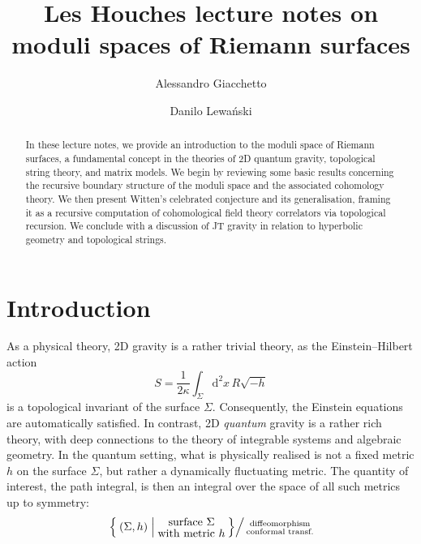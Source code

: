 \documentclass[11pt,reqno]{amsart}
\title[Moduli spaces of Riemann surfaces]{Les Houches lecture notes on moduli spaces of Riemann surfaces}
\author[A.~Giacchetto]{Alessandro Giacchetto}
\author[D.~Lewa{\'{n}}ski]{Danilo Lewa{\'{n}}ski}
\numberwithin{equation}{section}
\newcommand{\dd}{\mathrm{d}}
\theoremstyle{plain}
\theoremstyle{definition}
\begin{document}
\begin{abstract}
  In these lecture notes, we provide an introduction to the moduli space of Riemann surfaces, a fundamental concept in the theories of 2D quantum gravity, topological string theory, and matrix models. We begin by reviewing some basic results concerning the recursive boundary structure of the moduli space and the associated cohomology theory. We then present Witten's celebrated conjecture and its generalisation, framing it as a recursive computation of cohomological field theory correlators via topological recursion. We conclude with a discussion of JT gravity in relation to hyperbolic geometry and topological strings.
\end{abstract}

\maketitle

\vspace{-.5cm}

\setcounter{tocdepth}{2}
\tableofcontents

\newpage
\section{Introduction}
\label{sec:intro}

As a physical theory, 2D gravity is a rather trivial theory, as the Einstein--Hilbert action
\begin{equation}
  S = \frac{1}{2\kappa} \int_{\Sigma} \dd^2x \, R \sqrt{-h}  
\end{equation}
is a topological invariant of the surface $\Sigma$. Consequently, the Einstein equations are automatically satisfied. 
In contrast, 2D \emph{quantum} gravity is a rather rich theory, with deep connections to the theory of integrable systems and algebraic geometry.
In the quantum setting, what is physically realised is not a fixed metric $h$ on the surface $\Sigma$, but rather a dynamically fluctuating metric. 
The quantity of interest, the path integral, is then an integral over the space of all such metrics up to symmetry:
\begin{equation}
  \left.
  \Set{ (\Sigma,h) | \substack{\displaystyle\text{surface $\Sigma$} \\[.5ex] \displaystyle\text{with metric $h$}}}
  \right/
  \substack{\text{diffeomorphism} \\ \text{conformal transf.}}
\end{equation}
\end{document}
